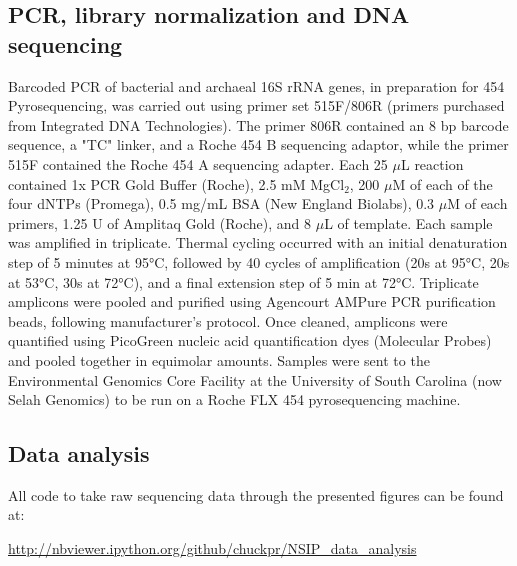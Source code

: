  \subsection{PCR, library normalization and DNA sequencing} 
 Barcoded PCR of bacterial and archaeal 16S
 rRNA genes, in preparation for 454 Pyrosequencing, was carried out using
 primer set 515F/806R \citep{21349862} (primers purchased from Integrated DNA
 Technologies).  The primer 806R contained an 8 bp
 barcode sequence, a "TC" linker, and a Roche 454 B sequencing adaptor, while
 the primer 515F contained the Roche 454 A sequencing adapter. Each 25 $\mu$L
 reaction contained 1x PCR Gold Buffer (Roche), 2.5 mM MgCl$_{2}$, 200 $\mu$M
 of each of the four dNTPs (Promega), 0.5 mg/mL BSA (New England Biolabs), 0.3
 $\mu$M of each primers, 1.25 U of Amplitaq Gold (Roche), and 8 $\mu$L of
 template. Each sample was amplified in triplicate. Thermal cycling occurred
 with an initial denaturation step of 5 minutes at 95°C, followed by 40 cycles
 of amplification (20s at 95°C, 20s at 53°C, 30s at 72°C), and a final
 extension step of 5 min at 72°C. Triplicate amplicons were pooled and purified
 using Agencourt AMPure PCR purification beads, following manufacturer’s
 protocol. Once cleaned, amplicons were quantified using PicoGreen nucleic acid
 quantification dyes (Molecular Probes) and pooled together in equimolar
 amounts. Samples were sent to the Environmental Genomics Core Facility at the
 University of South Carolina (now Selah Genomics) to be run on a Roche FLX 454
 pyrosequencing machine. 
\subsection{Data analysis} 
All code to take raw sequencing data through the presented figures can be
found at:

\url{http://nbviewer.ipython.org/github/chuckpr/NSIP_data_analysis}

